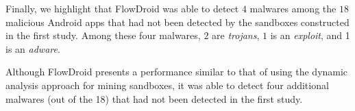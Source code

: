 


Finally, we highlight that FlowDroid was able to detect $4$ malwares among the $18$ malicious Android apps that had not
been detected by the sandboxes constructed in the first study. Among these
four malwares, $2$ are \emph{trojans}, $1$ is an \emph{exploit}, and 1 is an \emph{adware}.

\begin{finding}
  Although FlowDroid presents a performance similar
  to that of using the dynamic analysis approach for mining sandboxes,
  it was able to detect four additional malwares (out of the
  18) that had not been detected in the first study. 
\end{finding}



